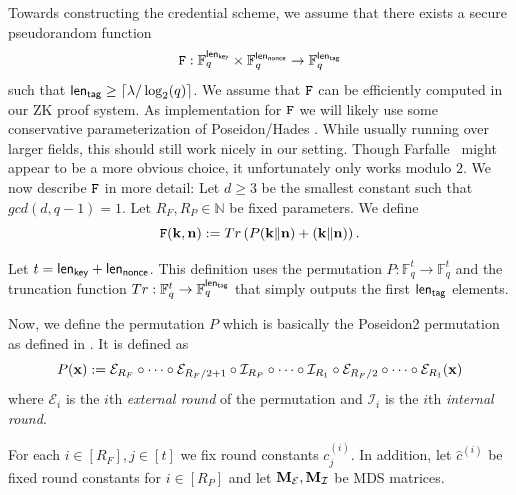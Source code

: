 Towards constructing the credential scheme, we assume that there exists a secure pseudorandom function \[
\mathtt{F}: \mathbb{F}_q^{\mathsf{len}_{\mathsf{key}}} \times \mathbb{F}_q^{\mathsf{len}_{\mathsf{nonce}}} \rightarrow \mathbb{F}_q^{\mathsf{len}_{\mathsf{tag}}}
\] 
such that $\mathsf{len}_{\mathsf{tag}} \geq \lceil \lambda/\log_2(q)\rceil$. We assume that $\mathtt{F}$ can be efficiently computed in our ZK proof system. As implementation for $\mathtt{F}$ we will likely use some conservative parameterization of Poseidon/Hades \cite{USENIX:GKRRS21,AFRICACRYPT:GraKhoSch23}. While usually running over larger fields, this should still work nicely in our setting. Though Farfalle~\cite{ToSC:BDHPVV17} might appear to be a more obvious choice, it unfortunately only works modulo $2$.
We now describe $\mathtt{F}$ in more detail: 
Let $d\geq 3$ be the smallest constant such that $gcd(d,q-1)=1$. Let $R_F, R_P\in \mathbb{N}$ be fixed parameters. We define 
\[
\mathtt{F}(\mathbf{k},\mathbf{n}):=Tr\left(P(\mathbf{k}\|\mathbf{n})+(\mathbf{k}\| \mathbf{n})\right)\text{.}
\]

Let $t=\mathsf{len}_{\mathsf{key}}+\mathsf{len}_{\mathsf{nonce}}$.
This definition uses the permutation $P: \mathbb{F}_q^{t} \rightarrow \mathbb{F}_q^{t}$ and the truncation function $Tr:\mathbb{F}_q^{t}\rightarrow \mathbb{F}_q^{\mathsf{len}_{\mathsf{tag}}}$ that simply outputs the first $\mathsf{len}_{\mathsf{tag}}$ elements. 

Now, we define the permutation $P$ which is basically the Poseidon2 permutation as defined in \cite{AFRICACRYPT:GraKhoSch23}.
It is defined as 
\[
P(\mathbf{x}):=\mathcal{E}_{R_F}\circ \cdots \circ \mathcal{E}_{R_F/2+1}\circ \mathcal{I}_{R_P}\circ \cdots \circ \mathcal{I}_{R_1}\circ \mathcal{E}_{R_F/2}\circ \cdots \circ \mathcal{E}_{R_1}(\mathbf{x})
\]
where $\mathcal{E}_{i}$ is the $i$th \emph{external round} of the permutation and $\mathcal{I}_{i}$ is the $i$th \emph{internal round}. 

For each $i\in[R_F],j\in [t]$ we fix round constants $c_j^{(i)}$. In addition, let $\hat{c}^{(i)}$ be fixed round constants for $i\in [R_P]$ and let $\mathbf{M}_{\mathcal{E}},\mathbf{M}_{\mathcal{I}}$ be MDS matrices.

